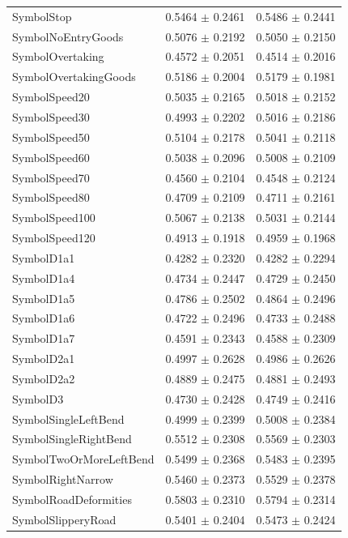 \begin{longtable}{@{}lrr@{}}
SymbolStop & 0.5464 $\pm$ 0.2461 & 0.5486 $\pm$ 0.2441 \\
SymbolNoEntryGoods & 0.5076 $\pm$ 0.2192 & 0.5050 $\pm$ 0.2150 \\
SymbolOvertaking & 0.4572 $\pm$ 0.2051 & 0.4514 $\pm$ 0.2016 \\
SymbolOvertakingGoods & 0.5186 $\pm$ 0.2004 & 0.5179 $\pm$ 0.1981 \\
SymbolSpeed20 & 0.5035 $\pm$ 0.2165 & 0.5018 $\pm$ 0.2152 \\
SymbolSpeed30 & 0.4993 $\pm$ 0.2202 & 0.5016 $\pm$ 0.2186 \\
SymbolSpeed50 & 0.5104 $\pm$ 0.2178 & 0.5041 $\pm$ 0.2118 \\
SymbolSpeed60 & 0.5038 $\pm$ 0.2096 & 0.5008 $\pm$ 0.2109 \\
SymbolSpeed70 & 0.4560 $\pm$ 0.2104 & 0.4548 $\pm$ 0.2124 \\
SymbolSpeed80 & 0.4709 $\pm$ 0.2109 & 0.4711 $\pm$ 0.2161 \\
SymbolSpeed100 & 0.5067 $\pm$ 0.2138 & 0.5031 $\pm$ 0.2144 \\
SymbolSpeed120 & 0.4913 $\pm$ 0.1918 & 0.4959 $\pm$ 0.1968 \\
SymbolD1a1 & 0.4282 $\pm$ 0.2320 & 0.4282 $\pm$ 0.2294 \\
SymbolD1a4 & 0.4734 $\pm$ 0.2447 & 0.4729 $\pm$ 0.2450 \\
SymbolD1a5 & 0.4786 $\pm$ 0.2502 & 0.4864 $\pm$ 0.2496 \\
SymbolD1a6 & 0.4722 $\pm$ 0.2496 & 0.4733 $\pm$ 0.2488 \\
SymbolD1a7 & 0.4591 $\pm$ 0.2343 & 0.4588 $\pm$ 0.2309 \\
SymbolD2a1 & 0.4997 $\pm$ 0.2628 & 0.4986 $\pm$ 0.2626 \\
SymbolD2a2 & 0.4889 $\pm$ 0.2475 & 0.4881 $\pm$ 0.2493 \\
SymbolD3 & 0.4730 $\pm$ 0.2428 & 0.4749 $\pm$ 0.2416 \\
SymbolSingleLeftBend & 0.4999 $\pm$ 0.2399 & 0.5008 $\pm$ 0.2384 \\
SymbolSingleRightBend & 0.5512 $\pm$ 0.2308 & 0.5569 $\pm$ 0.2303 \\
SymbolTwoOrMoreLeftBend & 0.5499 $\pm$ 0.2368 & 0.5483 $\pm$ 0.2395 \\
SymbolRightNarrow & 0.5460 $\pm$ 0.2373 & 0.5529 $\pm$ 0.2378 \\
SymbolRoadDeformities & 0.5803 $\pm$ 0.2310 & 0.5794 $\pm$ 0.2314 \\
SymbolSlipperyRoad & 0.5401 $\pm$ 0.2404 & 0.5473 $\pm$ 0.2424 \\

\end{longtable}
